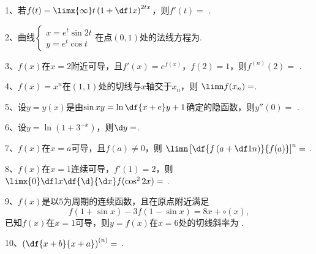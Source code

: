 1、若$f(t)=\limx{\infty}t\left(1+\df1x\right)^{2tx}$，则$f'(t)=$
\underline{\hspace{4cm}}.%


\bigskip

2、曲线$\left\{\begin{array}{l}
x=e^t\sin 2t\\ y=e^t\cos t
\end{array}\right.$在点$(0,1)$处的法线方程为\underline{\hspace{4cm}}.

\bigskip

3、$f(x)$在$x=2$附近可导，且$f'(x)=e^{f(x)}$，$f(2)=1$，则$f^{(n)}(2)=$
\underline{\hspace{4cm}}.%

\bigskip

4、$f(x)=x^n$在$(1,1)$处的切线与$x$轴交于$x_n$，则
$\limn f(x_n)=$\underline{\hspace{4cm}}.%

\bigskip

5、设$y=y(x)$是由$\sin xy=\ln\df{x+e}y+1$确定的隐函数，则$y''(0)=$
\underline{\hspace{4cm}}.%

\bigskip

6、设$y=\ln(1+3^{-x})$，则$\d y=$\underline{\hspace{4cm}}.

\bigskip

7、$f(x)$在$x=a$可导，且$f(a)\ne 0$，则
$\limn\left[\df{f\left(a+\df1n\right)}{f(a)}\right]^n=$
\underline{\hspace{4cm}}.%

\bigskip

8、$f(x)$在$x=1$连续可导，$f'(1)=2$，则
$\limx{0}\df1x\df{\d}{\d x}f(\cos^22x)=$
\underline{\hspace{4cm}}.%

\bigskip

9、$f(x)$是以$5$为周期的连续函数，且在原点附近满足
$$f(1+\sin x)-3f(1-\sin x)=8x+\circ(x),$$
已知$f(x)$在$x=1$可导，则$y=f(x)$在$x=6$处的切线斜率为
\underline{\hspace{4cm}}.%

\bigskip

10、$\left(\df{x+b}{x+a}\right)^{(n)}=$
\underline{\hspace{4cm}}.%

